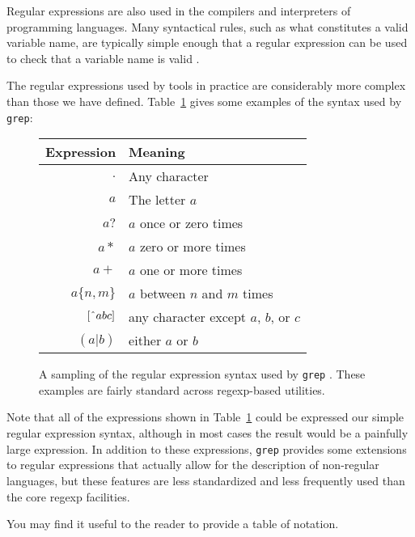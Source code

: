 \documentclass{bcthesis}
\newcommand{\footcite}[2]{\xspace\cite[pg.~{#2}]{#1}\xspace}
\begin{document}
		Regular expressions are also used in the compilers and interpreters of programming languages.
		Many syntactical rules, such as what constitutes a valid variable name, are typically simple enough that a regular expression can be used to check that a variable name is valid \footcite{hopcroft}{45 -- 46}.

		The regular expressions used by tools in practice are considerably more complex than those we have defined.
		Table~\ref{tab:grep_regexps} gives some examples of the syntax used by \texttt{grep}:

		\begin{figure}[H]
			\begin{tabular}{r l}
				\textbf{Expression} 	& \textbf{Meaning} \\
				\hline
				$.$ 					& Any character \\
				$a$ 					& The letter $a$ \\
				$a?$ 					& $a$ once or zero times \\
				$a*$ 					& $a$ zero or more times \\
				$a+$ 					& $a$ one or more times \\
				$a \{ n, m \}$ 			& $a$ between $n$ and $m$ times \\
				$[\char`^{} abc]$ 		& any character except $a$, $b$, or $c$ \\
				$(a | b)$ 				& either $a$ or $b$ \\
			\end{tabular}
			\caption{
				A sampling of the regular expression syntax used by \texttt{grep} \cite{man_grep}.
				These examples are fairly standard across regexp-based utilities.
			}
			\label{tab:grep_regexps}
		\end{figure}

		Note that all of the expressions shown in Table~\ref{tab:grep_regexps} could be expressed our simple regular expression syntax, although in most cases the result would be a painfully large expression.
		In addition to these expressions, \texttt{grep} provides some extensions to regular expressions that actually allow for the description of non-regular languages, but these features are less standardized and less frequently used than the core regexp facilities.



\iffalse
{}%
\label{ch:mathematical-notation}

You may find it useful to the reader to provide a table of notation. 
\end{document}
